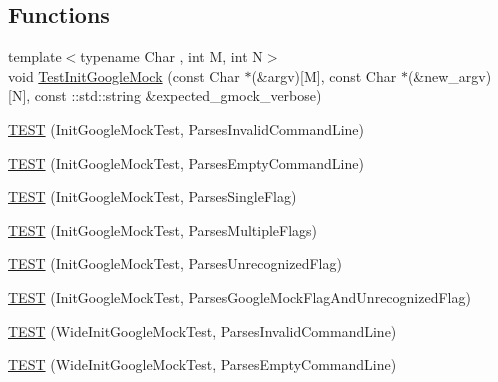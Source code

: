 \subsection*{Functions}
\begin{DoxyCompactItemize}
\item 
{\footnotesize template$<$typename Char , int M, int N$>$ }\\void \mbox{\hyperlink{_obj__test_2lib_2googletest-master_2googlemock_2test_2gmock__test_8cc_ac9c8ae8722c330d47f75dee43fb8ab78}{Test\+Init\+Google\+Mock}} (const Char $\ast$(\&argv)\mbox{[}M\mbox{]}, const Char $\ast$(\&new\+\_\+argv)\mbox{[}N\mbox{]}, const \+::std\+::string \&expected\+\_\+gmock\+\_\+verbose)
\item 
\mbox{\hyperlink{_obj__test_2lib_2googletest-master_2googlemock_2test_2gmock__test_8cc_a7c86c6c98b72e903135c1b01370a13f3}{T\+E\+ST}} (Init\+Google\+Mock\+Test, Parses\+Invalid\+Command\+Line)
\item 
\mbox{\hyperlink{_obj__test_2lib_2googletest-master_2googlemock_2test_2gmock__test_8cc_a29b51be89eb52fa64713438ecf4ab924}{T\+E\+ST}} (Init\+Google\+Mock\+Test, Parses\+Empty\+Command\+Line)
\item 
\mbox{\hyperlink{_obj__test_2lib_2googletest-master_2googlemock_2test_2gmock__test_8cc_ae24e1f90eac538406a16306612d7c380}{T\+E\+ST}} (Init\+Google\+Mock\+Test, Parses\+Single\+Flag)
\item 
\mbox{\hyperlink{_obj__test_2lib_2googletest-master_2googlemock_2test_2gmock__test_8cc_af2ebcdde7f19ba9d002c20673e41fb97}{T\+E\+ST}} (Init\+Google\+Mock\+Test, Parses\+Multiple\+Flags)
\item 
\mbox{\hyperlink{_obj__test_2lib_2googletest-master_2googlemock_2test_2gmock__test_8cc_ada1ddcc67dc056492a76fa398429038f}{T\+E\+ST}} (Init\+Google\+Mock\+Test, Parses\+Unrecognized\+Flag)
\item 
\mbox{\hyperlink{_obj__test_2lib_2googletest-master_2googlemock_2test_2gmock__test_8cc_aea344ddf9b83f7912dde4f8e7adbd4e2}{T\+E\+ST}} (Init\+Google\+Mock\+Test, Parses\+Google\+Mock\+Flag\+And\+Unrecognized\+Flag)
\item 
\mbox{\hyperlink{_obj__test_2lib_2googletest-master_2googlemock_2test_2gmock__test_8cc_ad66fde04be818693ebdcdcfc9943d57f}{T\+E\+ST}} (Wide\+Init\+Google\+Mock\+Test, Parses\+Invalid\+Command\+Line)
\item 
\mbox{\hyperlink{_obj__test_2lib_2googletest-master_2googlemock_2test_2gmock__test_8cc_ad08ca27203202ca15cdf8eaaa7003ba7}{T\+E\+ST}} (Wide\+Init\+Google\+Mock\+Test, Parses\+Empty\+Command\+Line)

\end{DoxyCompactItemize}
